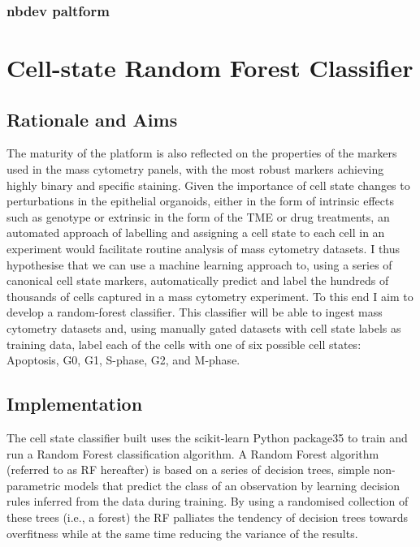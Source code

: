 \subsection{nbdev paltform}


\chapter{Cell-state Random Forest Classifier}
\label{appendix:rfclass}

\section*{Rationale and Aims}

The maturity of the platform is also reflected on the properties of the markers used in the mass cytometry panels, with the most robust markers achieving highly binary and specific staining. Given the importance of cell state changes to perturbations in the epithelial organoids, either in the form of intrinsic effects such as genotype or extrinsic in the form of the TME or drug treatments, an automated approach of labelling and assigning a cell state to each cell in an experiment would facilitate routine analysis of mass cytometry datasets. 
I thus hypothesise that we can use a machine learning approach to, using a series of canonical cell state markers, automatically predict and label the hundreds of thousands of cells captured in a mass cytometry experiment. To this end I aim to develop a random-forest classifier. This classifier will be able to ingest mass cytometry datasets and, using manually gated datasets with cell state labels as training data, label each of the cells with one of six possible cell states: Apoptosis, G0, G1, S-phase, G2, and M-phase. 

\section*{Implementation}
The cell state classifier built uses the scikit-learn Python package35 to train and run a Random Forest classification algorithm. A Random Forest algorithm (referred to as RF hereafter) is based on a series of decision trees, simple non-parametric models that predict the class of an observation by learning decision rules inferred from the data during training. By using a randomised collection of these trees (i.e., a forest) the RF palliates the tendency of decision trees towards overfitness while at the same time reducing the variance of the results.

